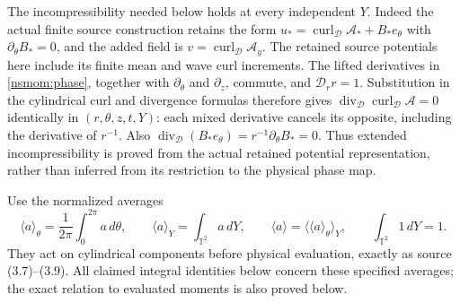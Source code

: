 \documentclass[11pt]{article}
\begin{document}
The incompressibility needed below holds at every independent $Y$.
Indeed the actual finite source construction retains the form
$u_* =\operatorname{curl}_{\mathscr D}\mathcal A_*+
B_*e_\theta$ with $\partial_\theta B_*=0$, and the added field is
$v=\operatorname{curl}_{\mathscr D}\mathcal A_y$. The retained source
potentials here include its finite mean and wave curl increments.
The lifted derivatives in \eqref{nsmom:phase}, together with
$\partial_\theta$ and $\partial_z$, commute, and
$\mathscr D_r r=1$. Substitution in the cylindrical curl and
divergence formulas therefore gives
$\operatorname{div}_{\mathscr D}\operatorname{curl}_{\mathscr D}
\mathcal A=0$ identically in $(r,\theta,z,t,Y)$: each mixed derivative
cancels its opposite, including the derivative of $r^{-1}$.
Also $\operatorname{div}_{\mathscr D}(B_*e_\theta)
=r^{-1}\partial_\theta B_*=0$.
Thus extended incompressibility is proved from the actual retained
potential representation, rather than inferred from its restriction to
the physical phase map.

Use the normalized averages
\[
 \langle a\rangle_\theta=\frac1{2\pi}\int_0^{2\pi}a\,d\theta,
 \qquad \langle a\rangle_Y=\int_{\mathbb T^2}a\,dY,
 \qquad\langle a\rangle=\langle\langle a\rangle_\theta\rangle_Y,
 \qquad\int_{\mathbb T^2}1\,dY=1.
\]
They act on cylindrical components before physical evaluation, exactly
as source (3.7)--(3.9). All claimed integral identities below concern
these specified averages; the exact relation to evaluated moments is
also proved below.
\end{document}

